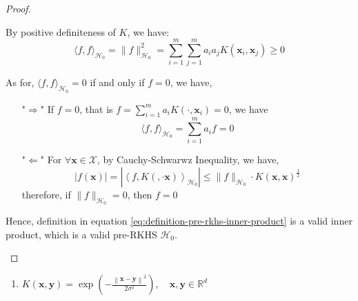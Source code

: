 \begin{proof}
\begin{enumerate}
\begin{enumerate}
                        By positive definiteness of $K$, we have:
                        \begin{equation*}
                            \langle f,f\rangle_{\mathcal{H}_{0}}=\|f\|_{\mathcal{H}_{0}}^{2}=\sum_{i=1}^{m}\sum_{j=1}^{m}a_{i}a_{j}K\left(\mathbf{x}_{i},\mathbf{x}_{j}\right)\geq 0
                        \end{equation*}

                        As for, $\langle f,f\rangle_{\mathcal{H}_{0}}=0$ if and only if $f=0$, we have,
                        \begin{itemize}
                            \item["$\Rightarrow$"] If $f=0$, that is $f=\sum_{i=1}^{m}a_{i}K\left(\cdot,\mathbf{x}_{i}\right)=0$, we have
                                \begin{equation*}
                                    \langle f,f\rangle_{\mathcal{H}_{0}}=\sum_{i=1}^{m}a_{i}f=0
                                \end{equation*}
                            \item["$\Leftarrow$"] For $\forall\mathbf{x}\in\mathcal{X}$, by Cauchy-Schwarwz Inequality, we have,
                                \begin{equation*}
                                    |f(\mathbf{x})|=\left|\left\langle f,K\left(,\cdot{\mathbf{x}}\right)\right\rangle_{\mathcal{H}_{0}}\right|\leq\|f\|_{\mathcal{H}_{0}}\cdot K\left(\mathbf{x},\mathbf{x}\right)^{\frac{1}{2}}
                                \end{equation*}
                                therefore, if $\|f\|_{\mathcal{H}_{0}}=0$, then $f=0$
                        \end{itemize}
              \end{enumerate}
              Hence, definition in equation \ref{eq:definition-pre-rkhs-inner-product} is a valid inner product, which is a valid pre-RKHS $\mathcal{H}_{0}$.
    \end{enumerate}
\end{proof}

\begin{example}
    \begin{enumerate}
        \item $K(\mathbf{x},\mathbf{y})=\exp\left(-\frac{\left\|\mathbf{x}-\mathbf{y}\right\|^{2}}{2\sigma^{2}}\right),\quad\mathbf{x},\mathbf{y}\in\mathbb{R}^{d}$
    \end{enumerate}
\end{example}

